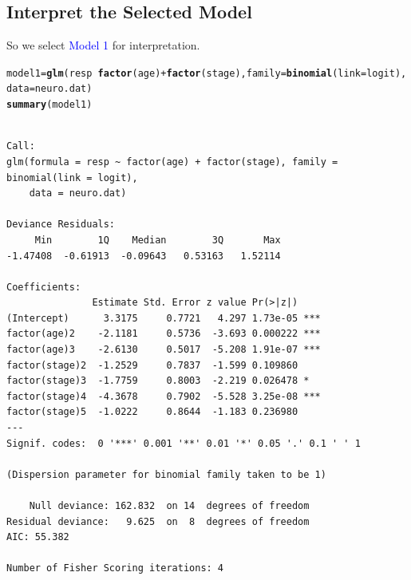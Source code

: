 \documentclass{article}\usepackage[]{graphicx}\usepackage[svgnames]{xcolor}
\makeatletter
\newcommand{\hlopt}[1]{\textcolor[rgb]{0,0,0}{#1}}%
\newcommand{\hlstd}[1]{\textcolor[rgb]{0.345,0.345,0.345}{#1}}%
\newcommand{\hlkwb}[1]{\textcolor[rgb]{0.69,0.353,0.396}{#1}}%
\newcommand{\hlkwc}[1]{\textcolor[rgb]{0.333,0.667,0.333}{#1}}%
\newcommand{\hlkwd}[1]{\textcolor[rgb]{0.737,0.353,0.396}{\textbf{#1}}}%
\newenvironment{kframe}{%
 \def\at@end@of@kframe{}%
 \ifinner\ifhmode%
  \def\at@end@of@kframe{\end{minipage}}%
  \begin{minipage}{\columnwidth}%
 \fi\fi%
 \def\FrameCommand##1{\hskip\@totalleftmargin \hskip-\fboxsep
 \colorbox{shadecolor}{##1}\hskip-\fboxsep
     \hskip-\linewidth \hskip-\@totalleftmargin \hskip\columnwidth}%
 \MakeFramed {\advance\hsize-\width
   \@totalleftmargin\z@ \linewidth\hsize
   \@setminipage}}%
 {\par\unskip\endMakeFramed%
 \at@end@of@kframe}
\newenvironment{knitrout}{}{} %
\makeatother
\begin{document}
\subsection*{Interpret the Selected Model}
So we select \textcolor{Blue}{Model 1} for interpretation.
\begin{knitrout}
\color{fgcolor}\begin{kframe}
\begin{alltt}
\hlstd{model1} \hlkwb{=} \hlkwd{glm}\hlstd{(resp} \hlopt{~} \hlkwd{factor}\hlstd{(age)} \hlopt{+} \hlkwd{factor}\hlstd{(stage),} \hlkwc{family} \hlstd{=} \hlkwd{binomial}\hlstd{(}\hlkwc{link} \hlstd{= logit),}
  \hlkwc{data} \hlstd{= neuro.dat)}
\hlkwd{summary}\hlstd{(model1)}
\end{alltt}
\begin{verbatim}

Call:
glm(formula = resp ~ factor(age) + factor(stage), family = binomial(link = logit), 
    data = neuro.dat)

Deviance Residuals: 
     Min        1Q    Median        3Q       Max  
-1.47408  -0.61913  -0.09643   0.53163   1.52114  

Coefficients:
               Estimate Std. Error z value Pr(>|z|)    
(Intercept)      3.3175     0.7721   4.297 1.73e-05 ***
factor(age)2    -2.1181     0.5736  -3.693 0.000222 ***
factor(age)3    -2.6130     0.5017  -5.208 1.91e-07 ***
factor(stage)2  -1.2529     0.7837  -1.599 0.109860    
factor(stage)3  -1.7759     0.8003  -2.219 0.026478 *  
factor(stage)4  -4.3678     0.7902  -5.528 3.25e-08 ***
factor(stage)5  -1.0222     0.8644  -1.183 0.236980    
---
Signif. codes:  0 '***' 0.001 '**' 0.01 '*' 0.05 '.' 0.1 ' ' 1

(Dispersion parameter for binomial family taken to be 1)

    Null deviance: 162.832  on 14  degrees of freedom
Residual deviance:   9.625  on  8  degrees of freedom
AIC: 55.382

Number of Fisher Scoring iterations: 4
\end{verbatim}
\end{kframe}
\end{knitrout}
\end{document}
